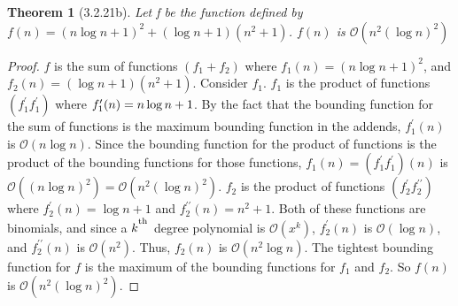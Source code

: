 \documentclass[a4paper, 12pt]{article}
\theoremstyle{plain}
\newtheorem*{theorem*}{Theorem}
\begin{document}
	
	\begin{theorem*}[3.2.21b]
		Let f be the function defined by \newline $f(n) = (n \log n + 1)^2 + (\log n + 1)(n^2 + 1)$. $f(n)$ is $\mathcal{O}(n^2 (\log n)^2)$
	\end{theorem*}
	
	\begin{proof}
		$f$ is the sum of functions $(f_1 + f_2)$ where $f_1(n) = (n \log n + 1)^2$, and $f_2(n) = (\log n + 1)(n^2 + 1)$. \newline \indent Consider $f_1$. $f_1$ is the product of functions $(f_1^\prime f_1^\prime)$ where $f_1^\prime(n) = \newline n \log n + 1$. By the fact that the bounding function for the sum of functions is the maximum bounding function in the addends, $f_1^\prime(n)$ is $\mathcal{O}(n \log n)$. Since the bounding function for the product of functions is the product of the bounding functions for those functions, $f_1(n) = (f_1^\prime f_1^\prime)(n)$ is $\mathcal{O}((n \log n)^2) =  \mathcal{O}(n^2 (\log n)^2)$.
		\newline \indent $f_2$ is the product of functions $(f_2^\prime f_2^{\prime \prime})$ where $f_2^\prime(n) = \log n + 1$ and $f_2^{\prime \prime}(n) = n^2 + 1$. Both of these functions are binomials, and since a $k^\textsuperscript{th}$ degree polynomial is $\mathcal{O}(x^k)$, $f_2^\prime(n)$ is $\mathcal{O}(\log n)$, and $f_2^{\prime \prime}(n)$ is $\mathcal{O}(n^2)$. Thus, $f_2(n)$ is $\mathcal{O}(n^2 \log n)$.
		\newline \indent The tightest bounding function for $f$ is the maximum of the bounding functions for $f_1$ and $f_2$. So $f(n)$ is $\mathcal{O}(n^2 (\log n)^2)$.
	\end{proof}
\end{document}
